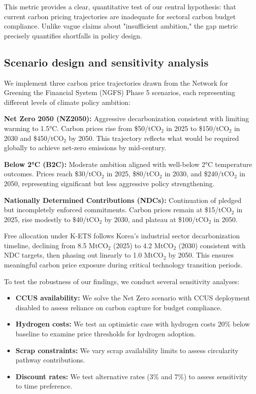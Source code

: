 This metric provides a clear, quantitative test of our central hypothesis: that current carbon pricing trajectories are inadequate for sectoral carbon budget compliance. Unlike vague claims about "insufficient ambition," the gap metric precisely quantifies shortfalls in policy design.

\subsection{Scenario design and sensitivity analysis}

We implement three carbon price trajectories drawn from the Network for Greening the Financial System (NGFS) Phase 5 scenarios, each representing different levels of climate policy ambition:

\textbf{Net Zero 2050 (NZ2050):} Aggressive decarbonization consistent with limiting warming to 1.5°C. Carbon prices rise from \$50/tCO$_2$ in 2025 to \$150/tCO$_2$ in 2030 and \$450/tCO$_2$ by 2050. This trajectory reflects what would be required globally to achieve net-zero emissions by mid-century.

\textbf{Below 2°C (B2C):} Moderate ambition aligned with well-below 2°C temperature outcomes. Prices reach \$30/tCO$_2$ in 2025, \$80/tCO$_2$ in 2030, and \$240/tCO$_2$ in 2050, representing significant but less aggressive policy strengthening.

\textbf{Nationally Determined Contributions (NDCs):} Continuation of pledged but incompletely enforced commitments. Carbon prices remain at \$15/tCO$_2$ in 2025, rise modestly to \$40/tCO$_2$ by 2030, and plateau at \$100/tCO$_2$ in 2050.

Free allocation under K-ETS follows Korea's industrial sector decarbonization timeline, declining from 8.5 MtCO$_2$ (2025) to 4.2 MtCO$_2$ (2030) consistent with NDC targets, then phasing out linearly to 1.0 MtCO$_2$ by 2050. This ensures meaningful carbon price exposure during critical technology transition periods.

To test the robustness of our findings, we conduct several sensitivity analyses:
\begin{itemize}[leftmargin=*]
  \item \textbf{CCUS availability:} We solve the Net Zero scenario with CCUS deployment disabled to assess reliance on carbon capture for budget compliance.
  \item \textbf{Hydrogen costs:} We test an optimistic case with hydrogen costs 20\% below baseline to examine price thresholds for hydrogen adoption.
  \item \textbf{Scrap constraints:} We vary scrap availability limits to assess circularity pathway contributions.
  \item \textbf{Discount rates:} We test alternative rates (3\% and 7\%) to assess sensitivity to time preference.
\end{itemize}

